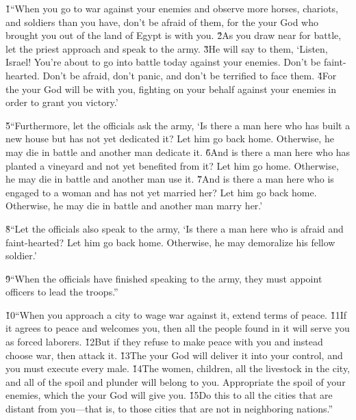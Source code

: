 \v{1}``When you go to war against your enemies and observe more horses, chariots, and soldiers than you have, don't be afraid of them, for the  your God who brought you out of the land of Egypt is with you. \v{2}As you draw near for battle, let the priest approach and speak to the army. \v{3}He will say to them, `Listen, Israel! You're about to go into battle today against your enemies. Don't be faint-hearted. Don't be afraid, don't panic, and don't be terrified to face them. \v{4}For the  your God will be with you, fighting on your behalf against your enemies in order to grant you victory.'

\v{5}``Furthermore, let the officials ask the army, `Is there a man here who has built a new house but has not yet dedicated it? Let him go back home. Otherwise, he may die in battle and another man dedicate it. \v{6}And is there a man here who has planted a vineyard and not yet benefited from it? Let him go home. Otherwise, he may die in battle and another man use it. \v{7}And is there a man here who is engaged to a woman and has not yet married her? Let him go back home. Otherwise, he may die in battle and another man marry her.'

\v{8}``Let the officials also speak to the army, `Is there a man here who is afraid and faint-hearted? Let him go back home. Otherwise, he may demoralize his fellow soldier.'

\v{9}``When the officials have finished speaking to the army, they must appoint officers to lead the troops.''

\v{10}``When you approach a city to wage war against it, extend terms of peace. \v{11}If it agrees to peace and welcomes you, then all the people found in it will serve you as forced laborers. \v{12}But if they refuse to make peace with you and instead choose war, then attack it. \v{13}The  your God will deliver it into your control, and you must execute every male. \v{14}The women, children, all the livestock in the city, and all of the spoil and plunder will belong to you. Appropriate the spoil of your enemies, which the  your God will give you. \v{15}Do this to all the cities that are distant from you---that is, to those cities that are not in neighboring nations.''

